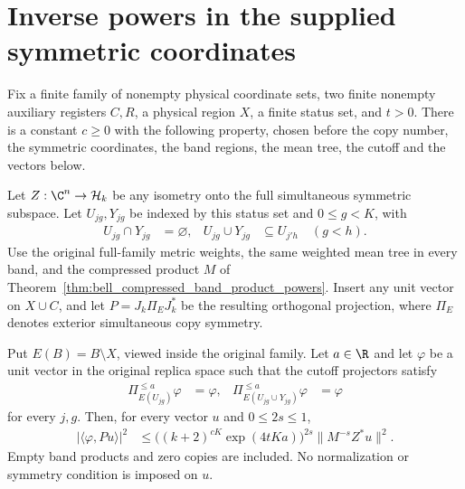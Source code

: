\section{Inverse powers in the supplied symmetric coordinates}

\begin{theorem}
    \label{thm:bell_compressed_inverse_norm}
    \leanok
    Fix a finite family of nonempty physical coordinate sets, two finite
    nonempty auxiliary registers $C,R$, a physical region $X$, a finite
    status set, and $t>0$.
    There is a constant $c\ge0$ with the following property, chosen before
    the copy number, the symmetric coordinates, the band regions, the
    mean tree, the cutoff and the vectors below.

    Let $Z:\C^n\to\mathcal H_k$ be any isometry onto the full simultaneous
    symmetric subspace. Let $U_{jg},Y_{jg}$ be indexed by this status
    set and $0\le g<K$, with
    \begin{align*}
        U_{jg}\cap Y_{jg}&=\varnothing,&
        U_{jg}\cup Y_{jg}&\subseteq U_{j'h}\quad(g<h).
    \end{align*}
    Use the original full-family metric weights, the same weighted mean
    tree in every band, and the compressed product $M$ of
    Theorem~\ref{thm:bell_compressed_band_product_powers}. Insert any unit
    vector on $X\cup C$, and let $P=J_k\Pi_EJ_k^*$ be the resulting
    orthogonal projection, where $\Pi_E$ denotes exterior simultaneous
    copy symmetry.

    Put $E(B)=B\setminus X$, viewed inside the original family. Let
    $a\in\R$ and let $\varphi$ be a unit vector in the original replica
    space such that the cutoff projectors satisfy
    \begin{align*}
        \Pi_{E(U_{jg})}^{\le a}\varphi&=\varphi,&
        \Pi_{E(U_{jg}\cup Y_{jg})}^{\le a}\varphi&=\varphi
    \end{align*}
    for every $j,g$. Then, for every vector $u$ and $0\le2s\le1$,
    \begin{align*}
        |\langle\varphi,Pu\rangle|^2
        &\le \bigl((k+2)^{cK}\exp(4tKa)\bigr)^{2s}
            \|M^{-s}Z^*u\|^2.
    \end{align*}
    Empty band products and zero copies are included. No normalization
    or symmetry condition is imposed on $u$.
\end{theorem}
